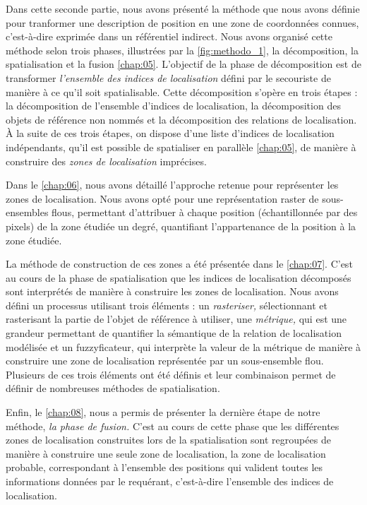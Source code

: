 Dans cette seconde partie, nous avons présenté la méthode que nous
avons définie pour tranformer une description de position en une zone
de coordonnées connues, c'est-à-dire exprimée dans un référentiel
indirect. Nous avons organisé cette méthode selon trois phases,
illustrées par la \autoref{fig:methodo_1}, la décomposition, la
spatialisation et la fusion \autoref{chap:05}. L'objectif de la phase
de décomposition est de transformer \emph{l'ensemble des indices de
  localisation} défini par le secouriste de manière à ce qu'il soit
spatialisable. Cette décomposition s'opère en trois étapes : la
décomposition de l'ensemble d'indices de localisation, la
décomposition des objets de référence non nommés et la décomposition
des relations de localisation. À la suite de ces trois étapes, on
dispose d'une liste d'indices de localisation indépendants, qu'il est
possible de spatialiser en parallèle \autoref{chap:05}, de manière à
construire des \emph{zones de localisation} imprécises.

Dans le \autoref{chap:06}, nous avons détaillé l'approche retenue pour
représenter les zones de localisation. Nous avons opté pour une
représentation raster de sous-ensembles flous, permettant d'attribuer
à chaque position (échantillonnée par des pixels) de la zone étudiée
un degré, quantifiant l'appartenance de la position à la zone étudiée.

La méthode de construction de ces zones a été présentée dans le
\autoref{chap:07}. C'est au cours de la phase de spatialisation que
les indices de localisation décomposés sont interprétés de manière à
construire les zones de localisation. Nous avons défini un processus
utilisant trois éléments : un \emph{rasteriser,} sélectionnant et
rasterisant la partie de l'objet de référence à utiliser, une
\emph{métrique,} qui est une grandeur permettant de quantifier la
sémantique de la relation de localisation modélisée et un
fuzzyficateur, qui interprète la valeur de la métrique de manière à
construire une zone de localisation représentée par un sous-ensemble
flou. Plusieurs de ces trois éléments ont été définis et leur
combinaison permet de définir de nombreuses méthodes de
spatialisation.

Enfin, le \autoref{chap:08}, nous a permis de présenter la dernière
étape de notre méthode, \emph{la phase de fusion.} C'est au cours de
cette phase que les différentes zones de localisation construites lors
de la spatialisation sont regroupées de manière à construire une seule
zone de localisation, la zone de localisation probable, correspondant
à l'ensemble des positions qui valident toutes les informations
données par le requérant, c'est-à-dire l'ensemble des indices de
localisation.

